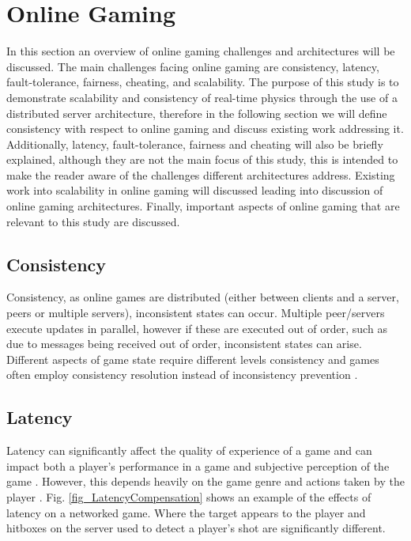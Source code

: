 \section{Online Gaming}
In this section an overview of online gaming challenges and architectures will be discussed. 
The main challenges facing online gaming are consistency, latency, fault-tolerance, fairness, cheating, and scalability. The purpose  of this study is to demonstrate scalability and consistency of real-time physics through the use of a distributed server architecture, therefore in the following section we will define consistency with respect to online gaming and discuss existing work addressing it. Additionally, latency, fault-tolerance, fairness and cheating will also be briefly explained, although they are not the main focus of this study, this is intended to make the reader aware of the challenges different architectures address. 
Existing work into scalability in online gaming will discussed leading into discussion of online gaming architectures. Finally, important aspects of online gaming that are relevant to this study are discussed.

\subsection{Consistency}
Consistency, as online games are distributed (either between clients and a server, peers or multiple servers), inconsistent states can occur. Multiple peer/servers execute updates in parallel, however if these are executed out of order, such as due to messages being received out of order, inconsistent states can arise.  Different aspects of game state require different levels consistency and games often employ consistency resolution instead of inconsistency prevention \cite{P2PSurvey}.


\subsection{Latency}
Latency can significantly affect the quality of experience of a game and can impact both a player's performance in a game \cite{EffectsofLossandLatency, claypool2010latency} and subjective perception of the game \cite{dick2005analysis}. However, this depends heavily on the game genre and actions taken by the player \cite{LatencyandPlayerActions, claypool2010latency}. Fig. \ref{fig_LatencyCompensation} shows an example of the effects of latency on a networked game. Where the target appears to the player and hitboxes on the server used to detect a player's shot are significantly different.

